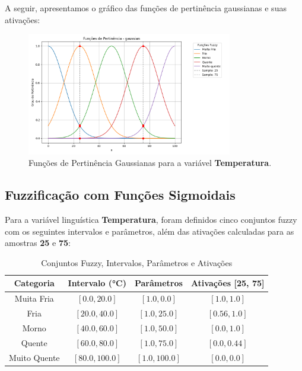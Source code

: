 \documentclass[a4paper,12pt]{article}
\begin{document}
A seguir, apresentamos o gráfico das funções de pertinência gaussianas e suas ativações:

\begin{figure}[H]
    \centering
    \includegraphics[width=0.8\textwidth]{img/funções_de_pertinência_gaussian_fuzzificado.png}
    \caption{Funções de Pertinência Gaussianas para a variável \textbf{Temperatura}.}
\end{figure}

\subsection{Fuzzificação com Funções Sigmoidais}

Para a variável linguística \textbf{Temperatura}, foram definidos cinco conjuntos fuzzy com os seguintes intervalos e parâmetros, além das ativações calculadas para as amostras \textbf{25} e \textbf{75}:

\begin{table}[H]
\centering
\caption{Conjuntos Fuzzy, Intervalos, Parâmetros e Ativações}
\begin{tabular}{|c|c|c|c|}
\hline
\textbf{Categoria}    & \textbf{Intervalo (°C)} & \textbf{Parâmetros}       & \textbf{Ativações [25, 75]} \\ \hline
Muita Fria            & $[0.0, 20.0]$          & $[1.0, 0.0]$              & $[1.0, 1.0]$               \\ \hline
Fria                  & $[20.0, 40.0]$         & $[1.0, 25.0]$             & $[0.56, 1.0]$             \\ \hline
Morno                 & $[40.0, 60.0]$         & $[1.0, 50.0]$             & $[0.0, 1.0]$              \\ \hline
Quente                & $[60.0, 80.0]$         & $[1.0, 75.0]$             & $[0.0, 0.44]$             \\ \hline
Muito Quente          & $[80.0, 100.0]$        & $[1.0, 100.0]$            & $[0.0, 0.0]$              \\ \hline
\end{tabular}
\end{table}
\end{document}
